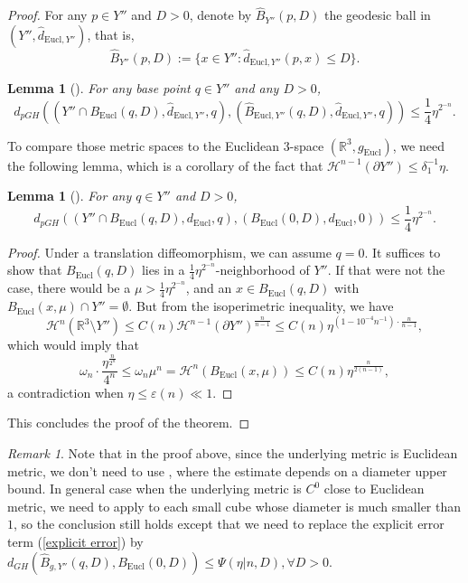 \documentclass[letter]{amsart}
\newtheorem{lem}[thm]{Lemma}
\theoremstyle{definition}
\theoremstyle{remark}
\newtheorem{rmk}{Remark}[section]
\begin{document}
\begin{proof}
For any $p \in Y'' $ and $D>0$, denote by $\hat{B}_{Y''}(p, D)$ the geodesic ball in $(Y'', \hat{d}_{\mathrm{Eucl}, Y'' })$, that is,
$$
\hat{B}_{Y''}(p,D):= \{x \in Y'' : \hat{d}_{\mathrm{Eucl}, Y'' }(p,x) \leq D\} .
$$ 

\begin{lem}[{\cite[Lemma 4.9]{DS'23}}]\label{Y'-B-B-hat-n}
For any base point $q \in Y''$ and any $D>0$,
	$$
	d_{pGH}( (Y'' \cap B_{\mathrm{Eucl}}(q, D), \hat{d}_{\mathrm{Eucl},Y''},q), ( \hat{B}_{\mathrm{Eucl},Y''}(q,D) , \hat{d}_{\mathrm{Eucl}, Y'' },q) ) \leq \frac{1}{4}\eta ^{2^{-n}}.
	$$ 
\end{lem}

To compare those metric spaces to the Euclidean $3$-space $(\mathbb{R}^3, g_{\mathrm{Eucl}})$, we need the following lemma, which is a corollary of the fact that $\mathcal{H}^{n-1}(\partial Y'')\leq \delta _1^{-1} \eta$.
\begin{lem}[{\cite[Lemma 4.12]{DS'23}}] \label{11111}
	For any $q \in Y'' $ and $D>0$,
	$$
	d_{pGH}((Y'' \cap B_{\mathrm{Eucl}}(q,D), d_{\mathrm{Eucl}}, q), (B_{\mathrm{Eucl}}(0, D), d_{\mathrm{Eucl}}, 0) ) \leq \frac{1}{4}\eta ^{2^{-n}}.
	$$ 
\end{lem}
\begin{proof}
	Under a translation diffeomorphism, we can assume $q=0$. It suffices to show that $B_{\mathrm{Eucl}}(q, D)$ lies in a $\frac{1}{4} \eta ^{2^{-n}}$-neighborhood of $Y'' $. If that were not the case, there would be a $\mu > \frac{1}{4} \eta ^{2^{-n}}$,
	and
	an $x \in B_{\mathrm{Eucl}}(q, D)$ with $B_{\mathrm{Eucl}}(x, \mu ) \cap Y'' = \emptyset$. 
But from the isoperimetric inequality, we have 
	$$
	\mathcal{H}^{n}(\mathbb{R}^3 \setminus Y'' )\leq C(n) \mathcal{H}^{n-1}(\partial Y'')^{\frac{n}{n-1}} \leq C(n) \eta ^{(1- 10^{-4}n^{-1})\cdot \frac{n}{n-1}},
	$$ 
	which would imply that
	$$
\omega _n\cdot  \frac{\eta ^{\frac{n}{2^{n}}}}{4^{n}} \leq	\omega _n \mu ^n=\mathcal{H}^{n}(B_{\mathrm{Eucl}}(x,\mu ) ) \leq C(n) \eta ^{\frac{n}{2(n-1)}},
	$$ 
	a contradiction when $\eta \leq \varepsilon (n) \ll 1$.
\end{proof}

This concludes the proof of the theorem.
\end{proof}
\begin{rmk}
	Note that in the proof above, since the underlying metric is Euclidean metric, we don't need to use \cite[Lemma 4.10]{DS'23}, where the estimate depends on a diameter upper bound. In general case when the underlying metric is $C^{0}$ close to Euclidean metric, we need to apply \cite[Lemma 4.10]{DS'23} to each small cube whose diameter is much smaller than $1$, so the conclusion still holds except that we need to replace the explicit error term (\ref{explicit error}) by $d_{GH}( \hat{B}_{g,Y''}(q, D) , B_{\mathrm{Eucl}}(0,D) ) \leq \Psi (\eta |n, D), \forall D>0$.
\end{rmk}






\end{document}
